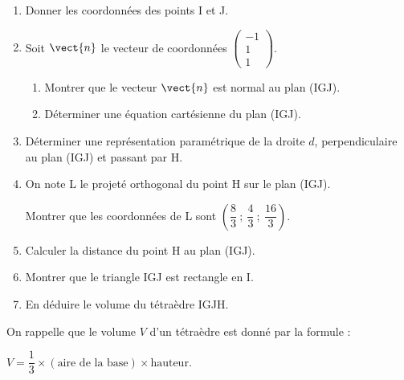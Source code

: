 \begin{enumerate}
\item Donner les coordonnées des points I et J.
\item Soit $\vect{n}$ le vecteur de coordonnées $\begin{pmatrix}-1\\1\\1\end{pmatrix}$.
	\begin{enumerate}
		\item Montrer que le vecteur $\vect{n}$ est normal au plan (IGJ).
		\item Déterminer une équation cartésienne du plan (IGJ).
	\end{enumerate}	
\item Déterminer une représentation paramétrique de la droite $d$, perpendiculaire au
plan (IGJ) et passant par H.
\item On note L le projeté orthogonal du point H sur le plan (IGJ).

Montrer que les coordonnées de L sont $\left(\dfrac83~;~ \dfrac43~;~\dfrac{16}{3}\right)$.
\item Calculer la distance du point H au plan (IGJ).
\item Montrer que le triangle IGJ est rectangle en I.
\item En déduire le volume du tétraèdre IGJH.
\end{enumerate}

\begin{center}
On rappelle que le volume $V$ d'un tétraèdre est donné par la formule :

$V = \dfrac13 \times (\text{aire de la base}) \times  \text{hauteur}.$
\end{center}

\bigskip
